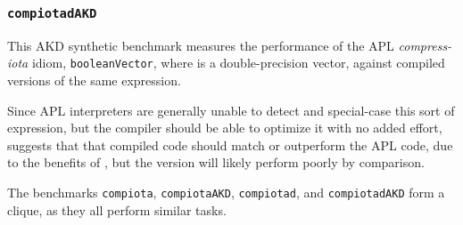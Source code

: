 \subsubsection{\tt compiotadAKD}
\label{benchmarkcompiotadakd}

This AKD synthetic benchmark measures the performance of the
APL {\em compress-iota} idiom, {\tt booleanVector\qslash\0\qomega},
where {\tt \qomega} is a double-precision vector,
against compiled versions of the same expression.

Since APL interpreters are generally unable to
detect and special-case this sort of expression, but the \sac compiler 
should be able to optimize it with no added effort, suggests that
that compiled \sac code should match or outperform the APL code,
due to the benefits of \awlf, but the \wlf version will
likely perform poorly by comparison.

The benchmarks {\tt compiota}, {\tt compiotaAKD}, {\tt compiotad}, and
{\tt compiotadAKD} form a clique, as they
all perform similar tasks.
